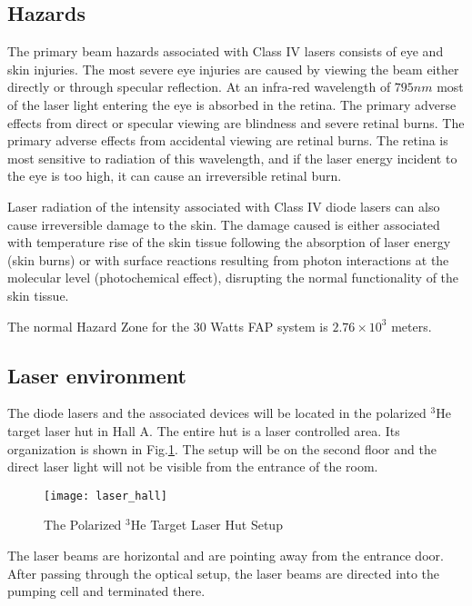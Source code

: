 {\subsection{Hazards}

The primary beam hazards associated with Class IV lasers consists of eye and skin
injuries. The most severe eye injuries are caused by viewing the beam either directly
or through specular reflection. At an infra-red wavelength of $795 nm$ most of the
laser light entering the eye is absorbed in the retina. The primary adverse effects
from direct or specular viewing are blindness and severe retinal burns. The primary
adverse effects from accidental viewing are retinal burns. The retina is most
sensitive to radiation of this wavelength, and if the laser energy incident to the eye
is too high, it can cause an irreversible retinal burn.

Laser radiation of the intensity associated with Class IV diode lasers can also
cause irreversible damage to the skin. The damage caused is either associated with
temperature rise of the skin tissue following the absorption of laser energy (skin
burns) or with surface reactions resulting from photon interactions at the molecular
level (photochemical effect), disrupting the normal functionality of the skin tissue.

The normal Hazard Zone for the 30 Watts FAP system is $2.76 \times 10^3$ meters.


\subsection{Laser environment}

The diode lasers and the associated devices will be located in the
polarized $^3$He target laser hut in Hall A.  The entire hut is a
laser controlled area. Its organization is shown in
Fig.\ref{fig:laser_hall}. The setup will be on the second floor and
the direct laser light will not be visible from the entrance of the
room.


\begin{figure}
  \centerline{\texttt{[image: laser\_hall]}}
  \caption[Polarized $^3$He Laser Hut]{The Polarized $^3$He Target Laser Hut Setup}
   \label{fig:laser_hall} 
\end{figure}

The laser beams are horizontal and are pointing away from the entrance door. 
After passing through the optical setup, the laser beams 
are directed into the pumping cell and terminated there. 

}
